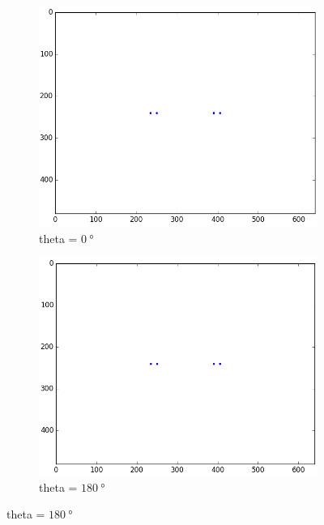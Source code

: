\begin{figure}[H]
  \centering
  \begin{subfigure}[b]{0.4\textwidth}
    \includegraphics[width=\textwidth]{./fig/1.png}
    \caption{theta = $\SI{0}{\degree}$}
  \end{subfigure}
  \begin{subfigure}[b]{0.4\textwidth}
    \includegraphics[width=\textwidth]{./fig/19.png}
    \caption{theta = $\SI{180}{\degree}$}
  \end{subfigure}
  

\end{figure}
